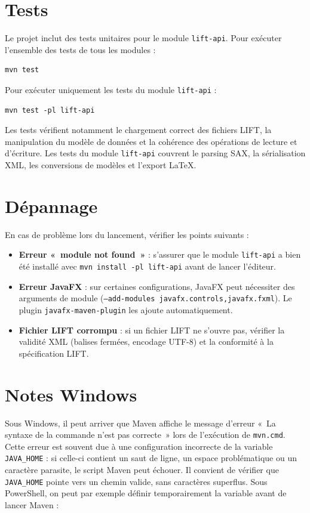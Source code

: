 \documentclass[11pt,twoside,openany]{book}
\begin{document}
\section{Tests}

Le projet inclut des tests unitaires pour le module \texttt{lift-api}. Pour exécuter l'ensemble des tests de tous les modules :

\begin{verbatim}
mvn test
\end{verbatim}

Pour exécuter uniquement les tests du module \texttt{lift-api} :

\begin{verbatim}
mvn test -pl lift-api
\end{verbatim}

Les tests vérifient notamment le chargement correct des fichiers LIFT, la manipulation du modèle de données et la cohérence des opérations de lecture et d'écriture. Les tests du module \texttt{lift-api} couvrent le parsing SAX, la sérialisation XML, les conversions de modèles et l'export LaTeX.

\section{Dépannage}

En cas de problème lors du lancement, vérifier les points suivants :

\begin{itemize}
\item \textbf{Erreur «~module not found~»} : s'assurer que le module \texttt{lift-api} a bien été installé avec \texttt{mvn install -pl lift-api} avant de lancer l'éditeur.
\item \textbf{Erreur JavaFX} : sur certaines configurations, JavaFX peut nécessiter des arguments de module (\texttt{--add-modules javafx.controls,javafx.fxml}). Le plugin \texttt{javafx-maven-plugin} les ajoute automatiquement.
\item \textbf{Fichier LIFT corrompu} : si un fichier LIFT ne s'ouvre pas, vérifier la validité XML (balises fermées, encodage UTF-8) et la conformité à la spécification LIFT.
\end{itemize}

\section{Notes Windows}

Sous Windows, il peut arriver que Maven affiche le message d'erreur «~La syntaxe de la commande n'est pas correcte~» lors de l'exécution de \texttt{mvn.cmd}. Cette erreur est souvent due à une configuration incorrecte de la variable \texttt{JAVA\_HOME} : si celle-ci contient un saut de ligne, un espace problématique ou un caractère parasite, le script Maven peut échouer. Il convient de vérifier que \texttt{JAVA\_HOME} pointe vers un chemin valide, sans caractères superflus. Sous PowerShell, on peut par exemple définir temporairement la variable avant de lancer Maven :
\end{document}
